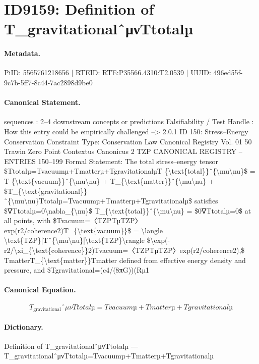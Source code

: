 \section*{ID9159: Definition of T\_gravitationalˆμνTtotalµ}
\paragraph{Metadata.}
PiID: 5565761218656 | RTEID: RTE:P35566.4310:T2.0539 | UUID: 496ed55f-9c7b-5ff7-8c44-7ac2898d9be0

\paragraph{Canonical Statement.}
sequences : 2–4 downstream concepts or predictions Falsifiability / Test Handle : How this entry could be empirically challenged --> 2.0.1 ID 150: Stress–Energy Conservation Constraint Type: Conservation Law Canonical Registry Vol. 01 50 Trawin Zero Point Contextus Canonicus 2 TZP CANONICAL REGISTRY – ENTRIES 150–199 Formal Statement: The total stress–energy tensor \$Ttotalµ=Tvacuumµ+Tmatterµ+TgravitationalµT \{\textbackslash{}text\{total\}\}ˆ\{\textbackslash{}mu\textbackslash{}nu\}\$ = T \{\textbackslash{}text\{vacuum\}\}ˆ\{\textbackslash{}mu\textbackslash{}nu\} + T\_\{\textbackslash{}text\{matter\}\}ˆ\{\textbackslash{}mu\textbackslash{}nu\} + \$T\_\{\textbackslash{}text\{gravitational\}\}ˆ\{\textbackslash{}mu\textbackslash{}nu\}Ttotalµ=Tvacuumµ+Tmatterµ+Tgravitationalµ\$ satisfies \$∇Ttotalµ=0\textbackslash{}nabla\_\{\textbackslash{}nu\}\$ T\_\{\textbackslash{}text\{total\}\}ˆ\{\textbackslash{}mu\textbackslash{}nu\} = \$0∇Ttotalµ=0\$ at all points, with \$Tvacuum=〈TZPTµTZP〉exp(r2/coherence2)T\_\{\textbackslash{}text\{vacuum\}\}\$ = \textbackslash{}langle \textbackslash{}text\{TZP\}|Tˆ\{\textbackslash{}mu\textbackslash{}nu\}|\textbackslash{}text\{TZP\}\textbackslash{}rangle \$\textbackslash{}exp(-r2/\textbackslash{}xi\_\{\textbackslash{}text\{coherence\}\}2)Tvacuum=〈TZPTµTZP〉exp(r2/coherence2),\$ TmatterT\_\{\textbackslash{}text\{matter\}\}Tmatter defined from effective energy density and pressure, and \$Tgravitational=(c4/(8πG))(Rµ1

\paragraph{Canonical Equation.}
\[
T_{\text{gravitational}}ˆ{\mu\nu}Ttotalµ=Tvacuumµ+Tmatterµ+Tgravitationalµ
\]

\paragraph{Dictionary.}
Definition of T\_gravitationalˆμνTtotalµ — T\_gravitationalˆμνTtotalµ=Tvacuumµ+Tmatterµ+Tgravitationalµ

